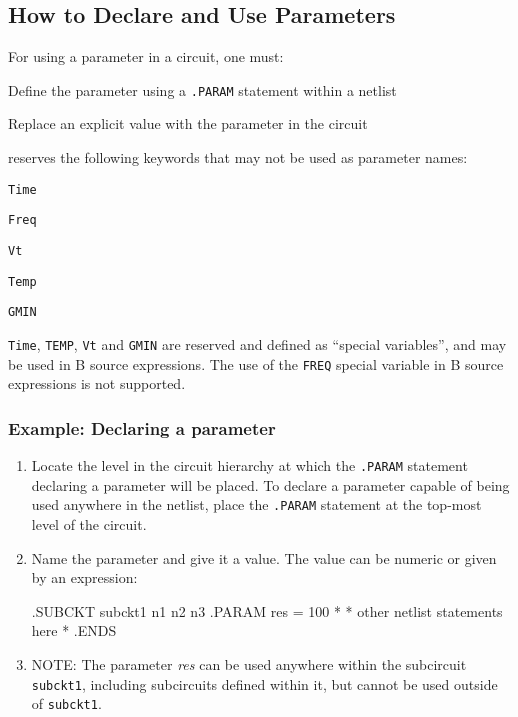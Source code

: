 \subsection{How to Declare and Use Parameters}

For using a parameter in a circuit, one must:
\begin{XyceItemize}
\item Define the parameter using a \verb+.PARAM+ statement within a netlist
\item Replace an explicit value with the parameter in the circuit
\end{XyceItemize}
 \Xyce{} reserves the following keywords that may not be used as parameter names:
\begin{XyceItemize}
\item \verb+Time+
\item \verb+Freq+ 
\item \verb+Vt+
\item \verb+Temp+
\item \verb+GMIN+
\end{XyceItemize}

\texttt{Time}, \texttt{TEMP}, \texttt{Vt} and \texttt{GMIN} are
reserved and defined as ``special variables'', and may be used in
B source expressions.  The use of the \texttt{FREQ} special variable
in B source expressions is not supported.

\subsubsection{Example:  Declaring a parameter}
\begin{enumerate}
\item Locate the level in the circuit hierarchy at which the \verb+.PARAM+
  statement declaring a parameter will be placed. To declare a parameter capable of being used anywhere in the netlist, place the \verb+.PARAM+ statement at the top-most level of the circuit.
\item Name the parameter and give it a value. The value can be numeric or given
  by an expression:
  \begin{vquote}
.SUBCKT subckt1 n1 n2 n3
.PARAM res = 100
*
* other netlist statements here
*
.ENDS
\end{vquote}
\item NOTE: The parameter \emph{res} can be used anywhere within the subcircuit
  \texttt{subckt1}, including subcircuits defined within it, but cannot be used outside
  of \texttt{subckt1}.
\end{enumerate}


